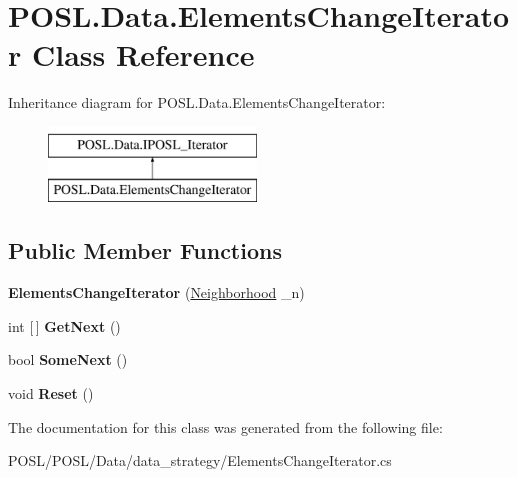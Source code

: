 \hypertarget{classPOSL_1_1Data_1_1ElementsChangeIterator}{}\section{P\+O\+S\+L.\+Data.\+Elements\+Change\+Iterator Class Reference}
\label{classPOSL_1_1Data_1_1ElementsChangeIterator}
Inheritance diagram for P\+O\+S\+L.\+Data.\+Elements\+Change\+Iterator\+:\begin{figure}[H]
\begin{center}
\leavevmode
\includegraphics[height=2.000000cm]{classPOSL_1_1Data_1_1ElementsChangeIterator}
\end{center}
\end{figure}
\subsection*{Public Member Functions}
\begin{DoxyCompactItemize}
\item 
\mbox{\label{classPOSL_1_1Data_1_1ElementsChangeIterator_aeaea7a035bb28c9d052d6eb9fe976d57}} 
{\bfseries Elements\+Change\+Iterator} (\hyperlink{classPOSL_1_1Data_1_1Neighborhood}{Neighborhood} \+\_\+n)
\item 
\mbox{\label{classPOSL_1_1Data_1_1ElementsChangeIterator_a506e0b82b8c3072082536d2aa3ff8c90}} 
int \mbox{[}$\,$\mbox{]} {\bfseries Get\+Next} ()
\item 
\mbox{\label{classPOSL_1_1Data_1_1ElementsChangeIterator_aa8c7f76b149ed5bb6a6853bfbab1700f}} 
bool {\bfseries Some\+Next} ()
\item 
\mbox{\label{classPOSL_1_1Data_1_1ElementsChangeIterator_af8e33b308ccd1529bc244979c097e58d}} 
void {\bfseries Reset} ()
\end{DoxyCompactItemize}


The documentation for this class was generated from the following file\+:\begin{DoxyCompactItemize}
\item 
P\+O\+S\+L/\+P\+O\+S\+L/\+Data/data\+\_\+strategy/Elements\+Change\+Iterator.\+cs\end{DoxyCompactItemize}
